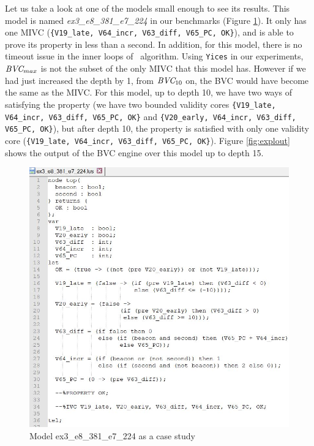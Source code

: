 Let us take a look at one of the models small enough to see its results. This model is named \emph{ex3\_e8\_381\_e7\_224} in our benchmarks (Figure \ref{fig:expl}). It only has one MIVC ({\small{\texttt{\{V19\_late, V64\_incr, V63\_diff, V65\_PC, OK\}}}}), and \jkind is able to prove its property in less than a second. In addition, for this model, there is no timeout issue in the inner loops of \aivcalg\ algorithm. Using \texttt{Yices} in our experiments, $\textit{BVC} _{max}$ is not the subset of the only MIVC that this model has. However if we had just increased the depth by 1, from $\textit{BVC} _{10}$ on, the BVC would have become the same as the MIVC. For this model, up to depth 10, we have two ways of satisfying the property (we have two bounded validity cores {\small{\texttt{\{V19\_late, V64\_incr, V63\_diff, V65\_PC, OK\}}}} and {\small{\texttt{\{V20\_early, V64\_incr, V63\_diff, V65\_PC, OK\}}}}), but after depth 10, the property is satisfied with only one validity core ({\small{\texttt{\{V19\_late, V64\_incr, V63\_diff, V65\_PC, OK\}}}}). Figure \ref{fig:explout} shows the output of the \jkind BVC engine over this model up to depth 15.

 \begin{figure}
 \centering
  \includegraphics[width=\columnwidth]{figs/expl.jpg}
  \caption{Model ex3\_e8\_381\_e7\_224 as a case study}
  \vspace{0.1in}
  \label{fig:expl}
\end{figure}

